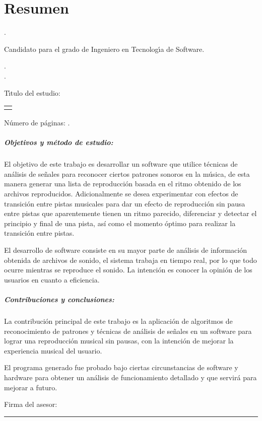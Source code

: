 
\chapter*{Resumen}

\noindent\autor.

\noindent Candidato para el grado de Ingeniero en Tecnolog\'{\i}a de Software.

\noindent\uanl.\\
\noindent\fime.

\noindent T\'{\i}tulo del estudio:

\begin{center}
\begin{tabular}{p{11cm}}
	\centering
	\scshape{\large{\titulo}}
\end{tabular}
\end{center}\bigskip

\noindent N\'{u}mero de p\'{a}ginas: \pageref*{lastpage}.

\paragraph{Objetivos y m\'{e}todo de estudio:}

El objetivo de este trabajo es desarrollar un software que utilice t\'ecnicas de an\'alisis de se\~nales para reconocer ciertos patrones sonoros en la m\'usica, de esta manera generar una lista de reproducci\'on basada en el ritmo obtenido de los archivos reproducidos. Adicionalmente se desea experimentar con efectos de transici\'on entre pistas musicales para dar un efecto de reproducci\'on sin pausa entre pistas que aparentemente tienen un ritmo parecido, diferenciar y detectar el principio y final de una pista, as\'i como el momento \'optimo para realizar la transici\'on entre pistas.

\noindent El desarrollo de software consiste en su mayor parte de an\'alisis de informaci\'on obtenida de archivos de sonido, el sistema trabaja en tiempo real, por lo que todo ocurre mientras se reproduce el sonido. La intenci\'on es conocer la opini\'on de los usuarios en cuanto a eficiencia.

\paragraph{Contribuciones y conclusiones:}

La contribuci\'on principal de este trabajo es la aplicaci\'on de algoritmos de reconocimiento de patrones y t\'ecnicas de an\'alisis de se\~nales en un software para lograr una reproducci\'on musical sin pausas, con la intenci\'on de mejorar la experiencia musical del usuario.

\noindent El programa generado fue probado bajo ciertas circunstancias de software y hardware para obtener un an\'alisis de funcionamiento detallado y que servir\'a para mejorar a futuro.

\noindent Firma del asesor: \rule{78mm}{0.3pt}

\vspace*{-4mm}

\noindent \phantom{Firma del asesor: m} \asesor
